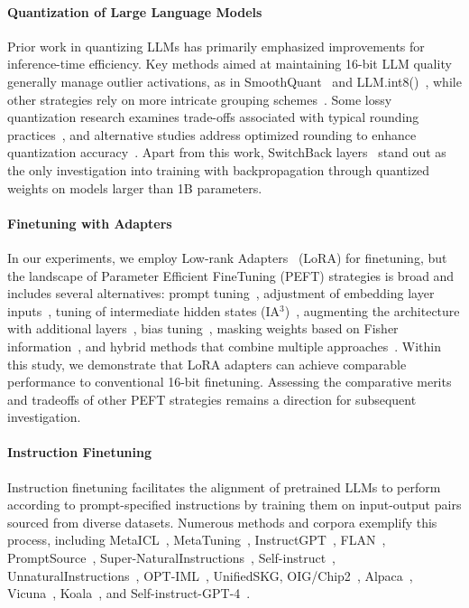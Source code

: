 \paragraph{Quantization of Large Language Models} Prior work in quantizing LLMs has primarily emphasized improvements for inference-time efficiency. Key methods aimed at maintaining 16-bit LLM quality generally manage outlier activations, as in SmoothQuant~\citep{xiao2022smoothquant} and LLM.int8()~\citep{dettmers2022llm}, while other strategies rely on more intricate grouping schemes~\citep{park2022nuqmm, yao2022zeroquant}. Some lossy quantization research examines trade-offs associated with typical rounding practices~\citep{dettmers2022case,zeng2022glm,pope2022efficiently}, and alternative studies address optimized rounding to enhance quantization accuracy~\citep{frantar2022gptq}. Apart from this work, SwitchBack layers~\citep{wortsman2023stable} stand out as the only investigation into training with backpropagation through quantized weights on models larger than 1B parameters.

\paragraph{Finetuning with Adapters} In our experiments, we employ Low-rank Adapters~\citep{hu2021lora} (LoRA) for finetuning, but the landscape of Parameter Efficient FineTuning (PEFT) strategies is broad and includes several alternatives: prompt tuning~\citep{qin2021learning,lester2021power,li2021prefix}, adjustment of embedding layer inputs~\citep{an2022input}, tuning of intermediate hidden states (IA$^3$)~\citep{liu2022few}, augmenting the architecture with additional layers~\citep{houlsby2019parameter}, bias tuning~\citep{zaken2021bitfit}, masking weights based on Fisher information~\citep{sung2021training}, and hybrid methods that combine multiple approaches~\citep{henderson2021compacter}. Within this study, we demonstrate that LoRA adapters can achieve comparable performance to conventional 16-bit finetuning. Assessing the comparative merits and tradeoffs of other PEFT strategies remains a direction for subsequent investigation.

\paragraph{Instruction Finetuning} Instruction finetuning facilitates the alignment of pretrained LLMs to perform according to prompt-specified instructions by training them on input-output pairs sourced from diverse datasets. Numerous methods and corpora exemplify this process, including MetaICL~\citep{min2021metaicl}, MetaTuning~\citep{zhong2021adapting}, InstructGPT~\citep{ouyang2022training}, FLAN~\citep{wei2021finetuned,chung2022scaling}, PromptSource~\citep{bach2022promptsource}, Super-NaturalInstructions~\citep{wang2022super,sanh2021multitask}, Self-instruct~\citep{wang2022self}, UnnaturalInstructions~\citep{honovich2022unnatural}, OPT-IML~\citep{iyer2022opt}, UnifiedSKG\citep{xie2022unifiedskg}, OIG/Chip2~\citep{laion2023}, Alpaca~\citep{alpaca}, Vicuna~\citep{vicuna2023}, Koala~\citep{koala_blogpost_2023}, and Self-instruct-GPT-4~\citep{peng2023instruction}.

